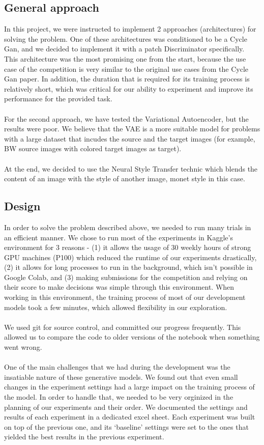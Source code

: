 \documentclass{article}
\begin{document}
\subsection{General approach}
In this project, we were instructed to implement 2 approaches (architectures) for solving the problem. One of these architectures was conditioned to be a Cycle Gan, and we decided to implement it with a patch Discriminator specifically. This architecture was the most promising one from the start, because the use case of the competition is very similar to the original use cases from the Cycle Gan paper. In addition, the duration that is required for its training process is relatively short, which was critical for our ability to experiment and improve its performance for the provided task.
\\\\
For the second approach, we have tested the Variational Autoencoder, but the results were poor. We believe that the VAE is a more suitable model for problems with a large dataset that incudes the source and the target images (for example, BW source images with colored target images as target).
\\\\
At the end, we decided to use the Neural Style Transfer technic which blends the content of an image with the style of another image, monet style in this case.


\subsection{Design}
In order to solve the problem described above, we needed to run many trials in an
efficient manner. We chose to run most of the experiments in Kaggle’s environment for 3 reasons - (1) it allows the usage of 30 weekly hours of strong GPU machines (P100) which reduced the runtime of our experiments drastically, (2) it allows for long processes to run in the background, which isn’t possible in Google Colab, and (3) making submissions for the competition and relying on their score to make decisions was simple through this environment. When working in this environment, the training process of most of our development models took a few minutes, which allowed flexibility in our exploration.
\\\\
We used git for source control, and committed our progress frequently. This allowed us to
compare the code to older versions of the notebook when something went wrong.
\\\\
One of the main challenges that we had during the development was the insatiable nature of these generative models. We found out that even small changes in the experiment settings had a large impact on the training process of the model. In order to handle that, we needed to be very orginized in the planning of our experiments and their order. We documented the settings and results of each experiment in a dedicated excel sheet. Each experiment was built on top of the previous one, and its ‘baseline’ settings were set to the ones that yielded the best results in the previous experiment.
\end{document}
